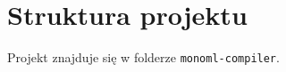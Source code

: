 \documentclass[declaration,shortabstract]{iithesis}
\begin{document}


\section{Struktura projektu}

Projekt znajduje się w folderze \texttt{monoml-compiler}.
\end{document}
